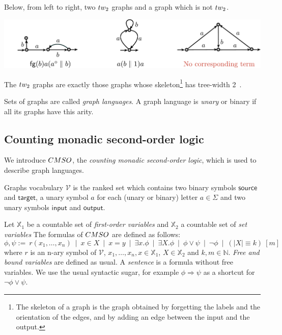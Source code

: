 \begin{example} Below, from left to right, two $\TWT$ graphs and a graph which is not $\TWT$. 
\begin{center}
\includegraphics[scale=.35]{Pictures/example-graph-term}
\end{center}
\end{example}
%
\begin{remark}
 The $\TWT$ graphs are exactly those graphs whose skeleton\footnote{The skeleton of a graph is the graph obtained by forgetting the labels and the orientation of the edges, and by adding an edge between the input and the output.} has tree-width 2~\cite{Cosme-LlopezP17}. 
\end{remark}

\begin{definition}
Sets of graphs are called \emph{graph languages}.  A graph language is \emph{unary} or binary if all its graphs have this arity.
\end{definition}


\subsection{Counting monadic second-order logic}

We introduce $\CMSO$, the \emph{counting monadic second-order logic}, which is used to describe graph languages. 

\begin{definition}
Graphs vocabulary $\mathcal{V}$ is the ranked set  which contains two binary symbols $\mathsf{source}$ and $\mathsf{target}$, a unary symbol $a$ for each (unary or binary) letter $a\in \Sigma$ and   two unary symbols $\mathsf{input}$ and $\mathsf{output}$. %
\smallskip

Let $\mathbb{X}_1$ be a countable set of \emph{first-order variables} and $\mathbb{X}_2$  a countable set of \emph{set variables}
 The formulas of $\CMSO$  are defined as follows:
$$ \phi, \psi:= \  r(x_1,\dots, x_n) \ \mid \ x\in X \ \mid\ x=y \ \mid \ \exists x. \phi \ \mid \ \exists X. \phi \ \mid\ \phi\vee \psi\ \mid \ \neg \phi\ \mid \ \left(|X|\equiv k\right)\ [m]$$ 
 where $r$ is an n-ary symbol of $\mathcal{V}$,  $x_1,\dots,x_n, x\in \mathbb{X}_1$,  $X\in\mathbb{X}_2$ and $k,m\in\mathbb{N}$. \emph{Free and bound variables} are defined as usual. A \emph{sentence} is a formula without free variables. We use the usual syntactic sugar, for example $\phi\Rightarrow\psi$ as a shortcut for $\neg \phi\vee \psi$.
\end{definition}


